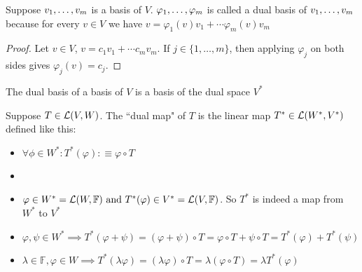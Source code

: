 \setcounter{thm}{113} 
\begin{thm}
    Suppose $v_1, \dots, v_m$ is a basis of $V$. $\varphi_1, \dots, \varphi_m$ is called a dual basis of $v_1, \dots, v_m$ because for every $v \in V$ we have $v=\varphi_1 (v)v_1 + \cdots \varphi_m(v)v_m$
\end{thm}
\begin{proof}
    Let $v\in V$, $v= c_1v_1 + \cdots c_mv_m$. If $j\in \{1, \dots, m\}$, then applying 
    $\varphi_j$ on both sides gives $\varphi_j(v)=c_j$.
\end{proof}

\setcounter{thm}{115}
\begin{thm}
    The dual basis of a basis of $V$ is a basis of the dual space $V^{*}$
\end{thm}

\setcounter{thm}{117}
\begin{mydef}
    Suppose $T \in {\mathcal{L}(V,W)}$. The ``dual map" of $T$ is the linear map $T^{*} \in {\mathcal{L}(W^{*}, V^{*})}$ defined like this:
    
    \begin{itemize}
    \item[] $\forall \phi \in W^{*}: T^{*}(\varphi) :\equiv \varphi \circ T $
    
    \item[]  
    
    \item $\varphi \in W^{*}={\mathcal{L}(W, \mathbb{F})} \text{ and } T^{*}(\varphi) \in V^{*} = {\mathcal{L}(V, \mathbb{F})}$.
    So $T^{*}$ is indeed a map from $W^{*}$ to $V^{*}$
    
    
    	\item $\varphi, \psi \in W^{*} \implies T^{*} (\varphi + \psi) = (\varphi + \psi) \circ T = \varphi \circ T + \psi \circ T = T^{*} (\varphi) + T^{*} (\psi)$
    	\item $\lambda \in \mathbb{F}, \varphi \in W \implies T^{*} (\lambda \varphi) = (\lambda \varphi) \circ T = \lambda (\varphi \circ T) = \lambda T^{*} (\varphi)$ 
    \end{itemize}
\end{mydef}


